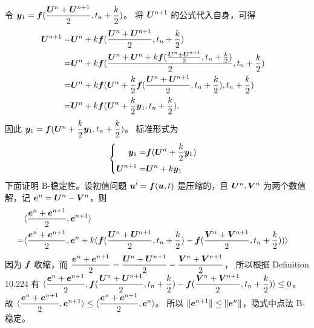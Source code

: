 \documentclass[lang=cn,a4paper,newtx,bibend=bibtex]{elegantpaper}
\begin{document}
\begin{solution}
  令 $\bm{y}_1 = \bm{f}(\dfrac{\bm{U}^n + \bm{U}^{n+1}}2, t_n + \dfrac k2)$。
  将 $\bm{U}^{n+1}$ 的公式代入自身，可得
  \begin{equation*}
    \begin{aligned}      
      \bm{U}^{n+1} = & \bm{U}^n + k\bm{f}(\dfrac{\bm{U}^n + \bm{U}^{n+1}}2, t_n + \dfrac k2) & \\
      = & \bm{U}^n + k\bm{f}(\dfrac{\bm{U}^n + \bm{U}^n + k\bm{f}(\frac{\bm{U}^n + \bm{U}^{n+1}}2, t_n + \frac k2)}2, t_n + \dfrac k2) & \\
      = & \bm{U}^n + k\bm{f}(\bm{U}^n + \dfrac k2\bm{f}(\dfrac{\bm{U}^n + \bm{U}^{n+1}}2, t_n + \dfrac k2), t_n + \dfrac k2) & \\
      = & \bm{U}^n + k\bm{f}(\bm{U}^n + \dfrac k2\bm{y}_1, t_n + \dfrac k2). & \\
    \end{aligned}
  \end{equation*}
  因此 $\bm{y}_1 = \bm{f}(\bm{U}^n + \dfrac k2\bm{y}_1, t_n + \dfrac k2)$。
  标准形式为
  \begin{equation*}
      \left\{
        \begin{aligned}
          \bm{y}_1 = & \bm{f}(\bm{U}^n + \dfrac k2 \bm{y}_1) & \\
          \bm{U}^{n+1} = & \bm{U}^n + k\bm{y}_1 & \\
        \end{aligned}
      \right.
  \end{equation*}
  下面证明 B-稳定性。设初值问题 $\bm{u}' = \bm{f}(\bm{u}, t)$ 是压缩的，且 $\bm{U}^n, \bm{V}^n$ 为两个数值解，记 $\bm{e}^n = \bm{U}^n - \bm{V}^n$，则
  \begin{equation*}
    \begin{aligned}
      & \langle \dfrac{\bm{e}^n + \bm{e}^{n+1}}2, \bm{e}^{n+1}\rangle \\
      = & \langle \dfrac{\bm{e}^n + \bm{e}^{n+1}}2, \bm{e}^n + k(\bm{f}(\dfrac{\bm{U}^n + \bm{U}^{n+1}}2, t_n + \dfrac k2) - \bm{f}(\dfrac{\bm{V}^n + \bm{V}^{n+1}}2, t_n + \dfrac k2))\rangle & \\
    \end{aligned}
  \end{equation*}
  因为 $\bm{f}$ 收缩，而 $\dfrac{\bm{e}^n+\bm{e}^{n+1}}2 = \dfrac{\bm{U}^n + \bm{U}^{n+1}}2 - \dfrac{\bm{V}^n + \bm{V}^{n+1}}2$，
  所以根据 Definition 10.224 有 $\langle \dfrac{\bm{e}^n + \bm{e}^{n+1}}2, \bm{f}(\dfrac{\bm{U}^n + \bm{U}^{n+1}}2, t_n + \dfrac k2) - \bm{f}(\dfrac{\bm{V}^n + \bm{V}^{n+1}}2, t_n + \dfrac k2)\rangle \leq 0$。
  故 $\langle \dfrac{\bm{e}^n + \bm{e}^{n+1}}2, \bm{e}^{n+1}\rangle  \leq \langle \dfrac{\bm{e}^n + \bm{e}^{n+1}}2, \bm{e}^{n}\rangle$。
  所以 $\Vert \bm{e}^{n+1}\Vert \leq \Vert \bm{e}^n\Vert$，隐式中点法 B-稳定。
\end{solution}

\nocite{*}
\printbibliography[heading=bibintoc, title=\ebibname]
\end{document}

